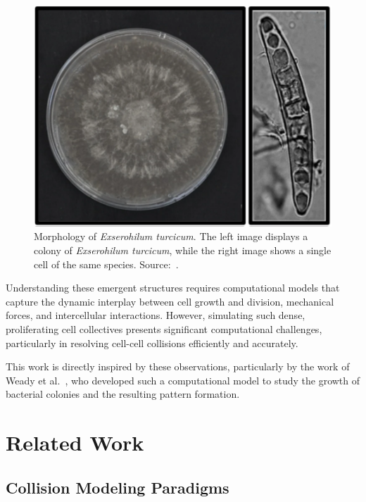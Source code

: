 \documentclass[conference]{IEEEtran}
\begin{document}
\begin{figure}[h]
    \centering
    \includegraphics[width=\linewidth]{figures/real-bacteria/Exserohilum turcicum.png}
    \caption{Morphology of \textit{Exserohilum turcicum}. The left image displays a colony of \textit{Exserohilum turcicum}, while the right image shows a single cell of the same species. Source:~\cite{Bankole2023}.}
    \label{fig:exserohilum_turcicum}
\end{figure}

Understanding these emergent structures requires computational models that capture the dynamic interplay between cell growth and division, mechanical forces, and intercellular interactions. However, simulating such dense, proliferating cell collectives presents significant computational challenges, particularly in resolving cell-cell collisions efficiently and accurately.

This work is directly inspired by these observations, particularly by the work of Weady et al.~\cite{Weady2024}, who developed such a computational model to study the growth of bacterial colonies and the resulting pattern formation.



\section{Related Work}

\subsection{Collision Modeling Paradigms}
\end{document}
